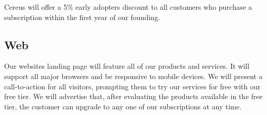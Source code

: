 Cereus will offer a 5\% early adopters discount to all customers who purchase a subscription within the first year of our founding.

\subsection{Web}

Our websites landing page will feature all of our products and services. It will support all major browsers and be responsive to mobile devices. We will present a call-to-action for all visitors, prompting them to try our services for free with our free tier. We will advertise that, after evaluating the products available in the free tier, the customer can upgrade to any one of our subscriptions at any time.
 


